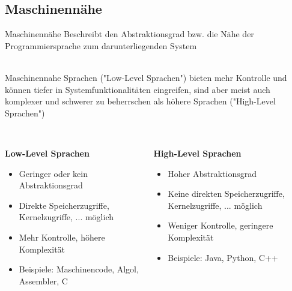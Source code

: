         \subsection{Maschinennähe}
            \begin{frame}{Maschinennähe}
                Beschreibt den Abstraktionsgrad bzw. die Nähe der Programmiersprache zum darunterliegenden System \\~\
                
                Maschinennahe Sprachen ("Low-Level Sprachen") bieten mehr Kontrolle und können tiefer in Systemfunktionalitäten eingreifen, sind aber meist auch komplexer und schwerer zu beherrschen als höhere Sprachen ("High-Level Sprachen") \\~\
                
                \begin{columns}[T]
                    \begin{column}{0.5\textwidth}
                        \textbf{Low-Level Sprachen}
                        
                        \begin{itemize}
                            \item Geringer oder kein Abstraktionsgrad
                            \item Direkte Speicherzugriffe, Kernelzugriffe, ... möglich
                            \item Mehr Kontrolle, höhere Komplexität
                            \item Beispiele: Maschinencode, Algol, Assembler, C
                        \end{itemize}
                    \end{column}
                    \begin{column}{0.5\textwidth}
                        \textbf{High-Level Sprachen}
                        
                        \begin{itemize}
                            \item Hoher Abstraktionsgrad
                            \item Keine direkten Speicherzugriffe, Kernelzugriffe, ... möglich
                            \item Weniger Kontrolle, geringere Komplexität
                            \item Beispiele: Java, Python, C++
                        \end{itemize}
                    \end{column}
                \end{columns}
                
            \end{frame}
        
